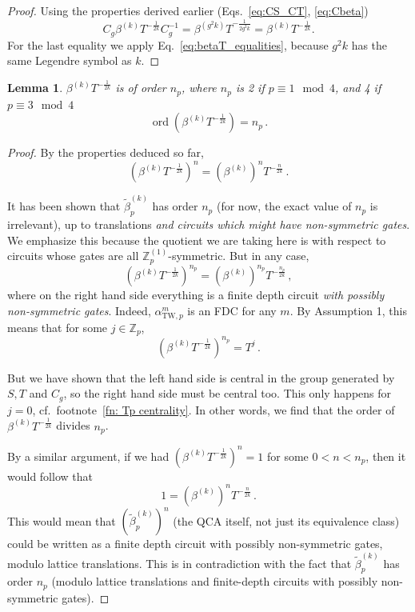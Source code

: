 \documentclass[aps,twocolumn,prx,floatfix,preprintnumbers, nofootinbib,10pt]{revtex4-2}
\numberwithin{equation}{section}
\newtheorem{lemma}[theorem]{Lemma}
\theoremstyle{definition}
\theoremstyle{remark}
\theoremstyle{claim}
\newcommand{\be}{\begin{equation}}
\newcommand{\ee}{\end{equation}}
\newcommand{\aTWp}{\alpha_{\text{TW},p}}
\newcommand{\ord}{\operatorname{ord}}
\newcommand{\Z}{{\mathbb Z}}
\newcommand{\paren}[1]{\left( #1 \right)}
\begin{document}
\begin{proof}
 Using the properties derived earlier (Eqs.~\eqref{eq:CS_CT}, \eqref{eq:Cbeta})
 \be
 C_g \beta^{(k)} T^{-\frac{1}{2k}} C_g^{-1} = \beta^{(g^2 k)} T^{-\frac{1}{2 g^2 k}} = \beta^{(k)} T^{-\frac{1}{2k}}.
 \ee
 For the last equality we apply Eq.~\eqref{eq:betaT_equalities}, because $g^2 k$ has the same Legendre symbol as $k$.
\end{proof}

\begin{lemma}\label{lem:order_of_betaT}
 $\beta^{(k)} T^{-\frac{1}{2k}}$ is of order $n_p$, where $n_p$ is 2 if $p \equiv 1 \mod 4$, and 4 if $p \equiv 3 \mod 4$
 \be\label{YuzuPi}
 \ord \paren{\beta^{(k)} T^{-\frac{1}{2k}}} = n_p \,.
 \ee
\end{lemma}

\begin{proof}
 By the properties deduced so far,
 \be
 \paren{\beta^{(k)} T^{-\frac{1}{2k}}}^n = \paren{\beta^{(k)}}^n T^{-\frac{n}{2k}} \,.
 \ee

 It has been shown \cite{MengSun2026} that $\tilde{\beta}_p^{(k)}$ has order $n_p$ (for now, the exact value of $n_p$ is irrelevant), up to translations \emph{and circuits which might have non-symmetric gates}. We emphasize this because the quotient we are taking here is with respect to circuits whose gates are all $\Z_p^{(1)}$-symmetric. But in any case,
 \be
 \paren{\beta^{(k)} T^{-\frac{1}{2k}}}^{n_p} = \paren{\beta^{(k)}}^{n_p} T^{-\frac{n_p}{2k}} \,,
 \ee
 where on the right hand side everything is a finite depth circuit \emph{with possibly non-symmetric gates}. Indeed, $\aTWp^m$ is an FDC for any $m$. By Assumption 1, this means that for some $j \in \Z_p$,
 \be
 \paren{\beta^{(k)} T^{-\frac{1}{2k}}}^{n_p} = T^j \,.
 \ee

 But we have shown that the left hand side is central in the group generated by $S, T$ and $C_g$, so the right hand side must be central too. This only happens for $j = 0$, cf.~footnote~\ref{fn: Tp centrality}. In other words, we find that the order of $\beta^{(k)} T^{-\frac{1}{2k}}$ divides $n_p$.

 By a similar argument, if we had $\paren{\beta^{(k)} T^{-\frac{1}{2k}}}^n = 1$ for some $0 < n < n_p$, then it would follow that
 \be
 1 = \paren{\beta^{(k)}}^n T^{-\frac{n}{2k}} \,.
 \ee
 This would mean that $(\tilde{\beta}_p^{(k)})^n$ (the QCA itself, not just its equivalence class) could be written as a finite depth circuit with possibly non-symmetric gates, modulo lattice translations. %
 This is in contradiction with the fact that $\tilde{\beta}_p^{(k)}$ has order $n_p$ (modulo lattice translations and finite-depth circuits with possibly non-symmetric gates).


\end{proof}
\end{document}
